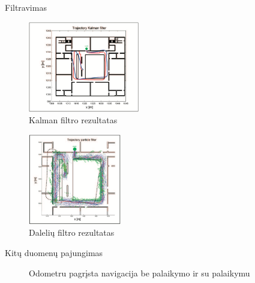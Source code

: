\documentclass{beamer}
\begin{document}
    \begin{frame}[allowframebreaks]{Filtravimas}

        \begin{figure}[H]
            \centering
            \includegraphics[height=150px]{img/kalman_filter.png}
            \caption{Kalman filtro rezultatas \cite{willemsenconcept}}
        \end{figure}

        \framebreak

        \begin{figure}[H]
            \centering
            \includegraphics[height=150px]{img/particle_filter.png}
            \caption{Dalelių filtro rezultatas \cite{willemsenconcept}}
        \end{figure}

    \end{frame}

    \begin{frame}{Kitų duomenų pajungimas}
        \begin{figure}
            \centering
            \caption{Odometru pagrįsta navigacija be palaikymo ir su palaikymu \cite{atia2015integrated}}
        \end{figure}
    \end{frame}
\end{document}

